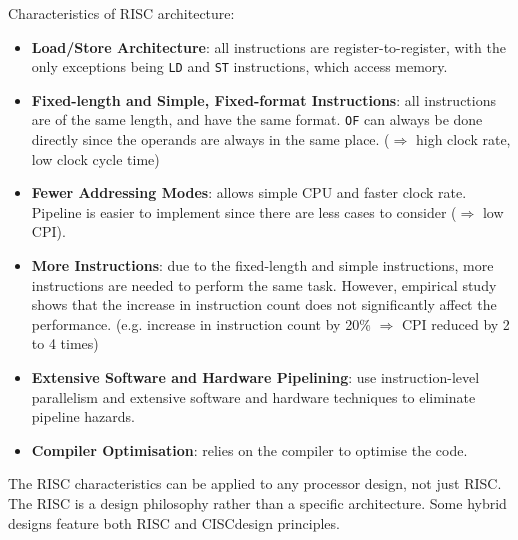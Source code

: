 Characteristics of RISC architecture:
\begin{itemize}
    \item \textbf{Load/Store Architecture}: all instructions are register-to-register, with the only
        exceptions being \texttt{LD} and \texttt{ST} instructions, which access memory.
    \item \textbf{Fixed-length and Simple, Fixed-format Instructions}: all instructions are of the same length,
        and have the same format. \texttt{OF} can always be done directly since the operands are always in the
        same place. ($\Rightarrow$ high clock rate, low clock cycle time)
    \item \textbf{Fewer Addressing Modes}: allows simple CPU and faster clock rate. Pipeline is easier to implement
        since there are less cases to consider ($\Rightarrow$ low CPI).
    \item \textbf{More Instructions}: due to the fixed-length and simple instructions, more instructions are needed
        to perform the same task. However, empirical study shows that the increase in instruction count does not
        significantly affect the performance. (e.g. increase in instruction count by 20\% $\Rightarrow$ 
        CPI reduced by 2 to 4 times)
    \item \textbf{Extensive Software and Hardware Pipelining}: use instruction-level parallelism and extensive
        software and hardware techniques to eliminate pipeline hazards.
    \item \textbf{Compiler Optimisation}: relies on the compiler to optimise the code.
\end{itemize}

\begin{remark}
    The RISC characteristics can be applied to any processor design, not just RISC.
    The RISC is a design philosophy rather than a specific architecture.
    Some hybrid designs feature both RISC and CISC\footnotemark design principles.
\end{remark}

